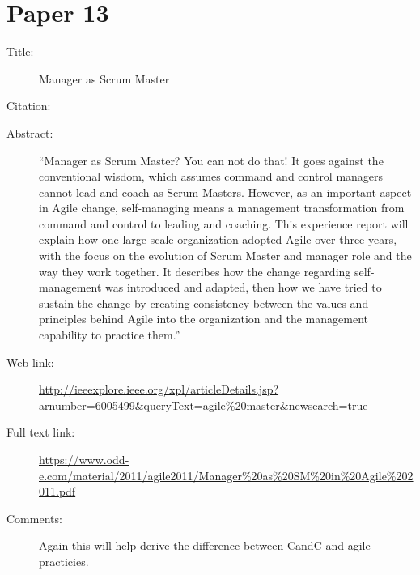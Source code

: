 \documentclass{scrartcl}
\begin{document}
\section*{Paper 13}
\begin{description}
	\item[Title:] Manager as Scrum Master
	\item[Citation:] \cite{ManagerMaster}
	\item[Abstract:] ``Manager as Scrum Master? You can not do that! It goes against the conventional wisdom, which assumes command and control managers cannot lead and coach as Scrum Masters. However, as an important aspect in Agile change, self-managing means a management transformation from command and control to leading and coaching. This experience report will explain how one large-scale organization adopted Agile over three years, with the focus on the evolution of Scrum Master and manager role and the way they work together. It describes how the change regarding self-management was introduced and adapted, then how we have tried to sustain the change by creating consistency between the values and principles behind Agile into the organization and the management capability to practice them.''
	\item[Web link:] \url{http://ieeexplore.ieee.org/xpl/articleDetails.jsp?arnumber=6005499&queryText=agile%20master&newsearch=true}
	\item[Full text link:] \url{https://www.odd-e.com/material/2011/agile2011/Manager%20as%20SM%20in%20Agile%202011.pdf}
	\item[Comments:] Again this will help derive the difference between CandC and agile practicies.
\end{description}
\end{document}
